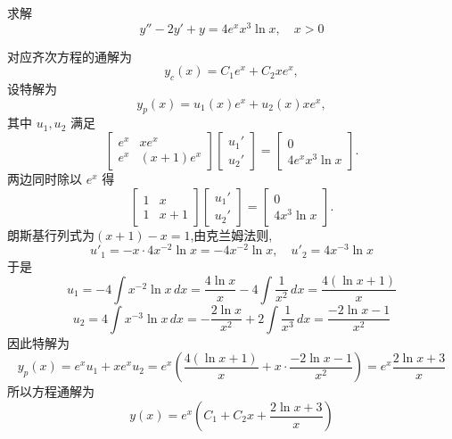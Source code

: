 \begin{questions}
    \question 求解
    \[
    y'' - 2y' + y = 4 e^x x^3 \ln x, \quad x>0
    \]
    \begin{solution}
        对应齐次方程的通解为
        \[
        y_c(x) = C_1 e^x + C_2 x e^x,
        \]
        设特解为
        \[
        y_p(x) = u_1(x) e^x + u_2(x) x e^x,
        \]
        其中 $u_1, u_2$ 满足
        \[
        \begin{bmatrix} e^x & x e^x \\ e^x & (x+1)e^x \end{bmatrix} 
        \begin{bmatrix} u_1' \\ u_2' \end{bmatrix} = 
        \begin{bmatrix} 0 \\ 4 e^x x^3 \ln x \end{bmatrix}.
        \]
        两边同时除以 $e^x$ 得
        \[
        \begin{bmatrix} 1 & x \\ 1 & x+1 \end{bmatrix} 
        \begin{bmatrix} u_1' \\ u_2' \end{bmatrix} =
        \begin{bmatrix} 0 \\ 4 x^3 \ln x \end{bmatrix}.
        \]
        朗斯基行列式为$(x+1)-x=1$,由克兰姆法则,
        \[
        u'_1 = -x \cdot 4x^{-2} \ln x = -4x^{-2} \ln x, \quad u'_2 = 4x^{-3} \ln x
        \]
        于是
        \[
        u_1 = -4 \int x^{-2} \ln x \, dx 
        = \frac{4 \ln x}{x} - 4 \int \frac{1}{x^2} \, dx = \frac{4(\ln x + 1)}{x}
        \]
        \[
        u_2 = 4 \int x^{-3} \ln x \, dx = -\frac{2 \ln x}{x^2} +2 \int \frac{1}{x^3} \, dx = \frac{-2 \ln x - 1}{x^2} 
        \]
        因此特解为
        \[
        y_p(x) = e^x u_1 + x e^x u_2 = e^x \left(\frac{4 (\ln x + 1)}{x} + x \cdot \frac{-2\ln x -1}{x^2}\right) = e^x \frac{2 \ln x + 3}{x}
        \]
        所以方程通解为
        \[
        y(x) = e^x \left(C_1 + C_2 x + \frac{2 \ln x + 3}{x}\right)
        \]
    \end{solution}


\end{questions}
